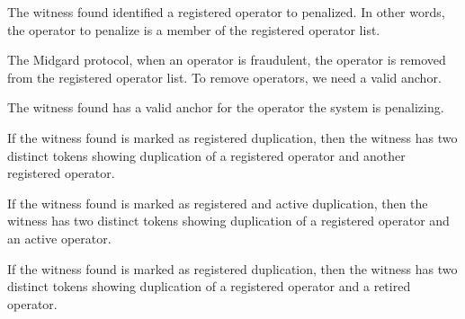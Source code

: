 \begin{theorem}
  \label{thm:OpsDir.OptimisticDetection.find_witness_key}
  \leanok
  The witness found identified a registered operator to penalized.
  In other words, the operator to penalize is a member of the registered operator list.
  \end{theorem}


The Midgard protocol, when an operator is fraudulent, the operator is removed
from the registered operator list.
%
To remove operators, we need a valid anchor.

\begin{theorem}
  \label{thm:OpsDir.OptimisticDetection.find_witness_registered}
  \leanok
  The witness found has a valid anchor for the operator the
system is penalizing.
  \end{theorem}

\begin{theorem}
  \label{thm:OpsDir.OptimisticDetection.find_witness_dup_reg}
  \leanok
  If the witness found is marked as registered duplication, then the witness has
two distinct tokens showing duplication of a registered operator and another
registered operator.
  \end{theorem}
\begin{theorem}
  \label{thm:OpsDir.OptimisticDetection.find_witness_dup_act}
  \leanok
  If the witness found is marked as registered and active duplication, then the witness has
two distinct tokens showing duplication of a registered operator and an active operator.
  \end{theorem}
\begin{theorem}
  \label{thm:OpsDir.OptimisticDetection.find_witness_dup_ret}
  \leanok
  If the witness found is marked as registered duplication, then the witness has
  two distinct tokens showing duplication of a registered operator and
  a retired operator.
  \end{theorem}

